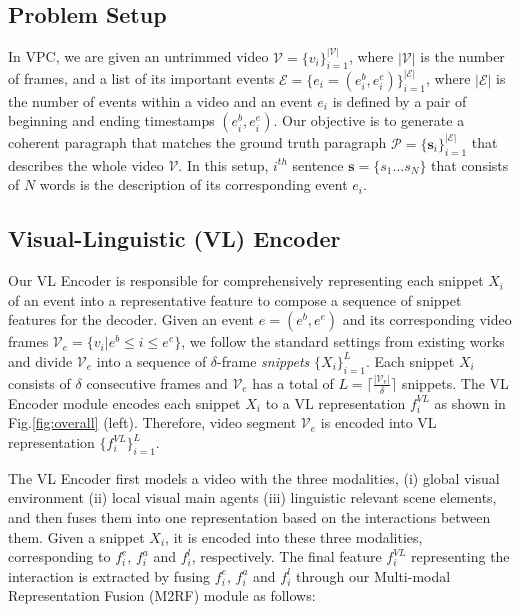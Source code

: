 \documentclass[letterpaper]{article} \usepackage{aaai23}  \usepackage{times}  \usepackage{helvet}  \usepackage{courier}  \usepackage[hyphens]{url}  \usepackage{graphicx} \urlstyle{rm} \def\UrlFont{\rm}  \usepackage{natbib}  \usepackage{caption} \frenchspacing  \setlength{\pdfpagewidth}{8.5in}  \setlength{\pdfpageheight}{11in}  \usepackage{algorithm}
\newcommand{\encoder}{VL Encoder\xspace}
\begin{document}
\subsection{Problem Setup}
\label{sec:setup}
In VPC, we are given an untrimmed video $\mathcal{V}=\{v_i\}_{i=1}^\mathcal{|V|}$, where $|\mathcal{V}|$ is the number of frames, and a list of its important events $\mathcal{E}=\{e_i=(e^b_i, e^e_i)\}_{i=1}^{|\mathcal{E}|}$, where $|\mathcal{E}|$ is the number of events within a video and an event $e_i$ is defined by a pair of beginning and ending timestamps $(e^b_i, e^e_i)$. Our objective is to generate a coherent paragraph that matches the ground truth paragraph $\mathcal{P}=\{\textbf{s}_i\}_{i=1}^{|\mathcal{E}|}$ that describes the whole video $\mathcal{V}$. In this setup, $i^{th}$ sentence $\textbf{s}=\{s_1 \dots s_N\}$ that consists of $N$ words is the description of its corresponding event $e_i$.










\subsection{Visual-Linguistic (VL) Encoder}
\label{sec:vl_encode}
Our \encoder is responsible for comprehensively representing each snippet $X_i$ of an event into a representative feature to compose a sequence of snippet features for the decoder.
Given an event $e=(e^b,e^e)$ and its corresponding video frames $\mathcal{V}_e=\{v_i|e^b\leq i \leq e^e\}$, we follow the standard settings from existing works \cite{zhou2018end, lei2020mart, Song2021} and divide $\mathcal{V}_e$ into a sequence of $\delta$-frame \textit{snippets} $\{X_i\}_{i=1}^L$. Each snippet $X_i$ consists of $\delta$ consecutive frames and $\mathcal{V}_e$ has a total of $L=\bigr\lceil \frac{|\mathcal{V}_e|}{\delta} \bigr\rceil$ snippets. The \encoder module encodes each snippet $X_i$ to a VL representation $f_i^{VL}$ as shown in Fig.\ref{fig:overall} (left). Therefore, video segment $\mathcal{V}_e$ is encoded into VL representation  $\{f_i^{VL}\}_{i=1}^L$. 




The \encoder first models a video with the three modalities, (i) global visual environment (ii) local visual main agents (iii) linguistic relevant scene elements, and then fuses them into one representation based on the interactions between them. Given a snippet $X_i$, it is encoded into these three modalities, corresponding to $f_i^e$, $f_i^a$ and $f_i^l$, respectively. The final feature $f_i^{VL}$ representing the interaction is extracted by fusing $f_i^e$, $f_i^a$ and $f_i^l$ through our Multi-modal Representation Fusion (M2RF) module as follows:
\end{document}
